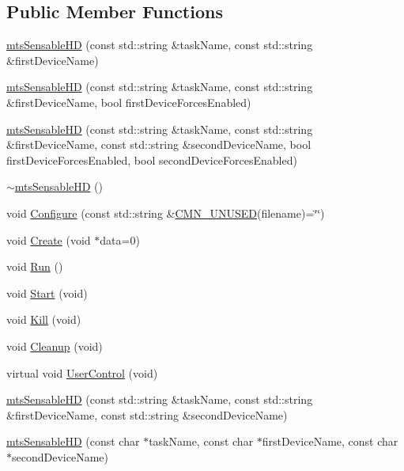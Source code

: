 \subsection*{Public Member Functions}
\begin{DoxyCompactItemize}
\item 
\hyperlink{classmts_sensable_h_d_a8edc1b99888eea9146e97e9e1e4244a2}{mts\-Sensable\-H\-D} (const std\-::string \&task\-Name, const std\-::string \&first\-Device\-Name)
\item 
\hyperlink{classmts_sensable_h_d_a65eb4de4d62c141f61b4c5afaa3b12ca}{mts\-Sensable\-H\-D} (const std\-::string \&task\-Name, const std\-::string \&first\-Device\-Name, bool first\-Device\-Forces\-Enabled)
\item 
\hyperlink{classmts_sensable_h_d_a21ff41ea6bf303e046d42f1c5843d31a}{mts\-Sensable\-H\-D} (const std\-::string \&task\-Name, const std\-::string \&first\-Device\-Name, const std\-::string \&second\-Device\-Name, bool first\-Device\-Forces\-Enabled, bool second\-Device\-Forces\-Enabled)
\item 
\hyperlink{classmts_sensable_h_d_a9fbacf9fb330e6acb3715bcb1f6ff66e}{$\sim$mts\-Sensable\-H\-D} ()
\item 
void \hyperlink{classmts_sensable_h_d_a3819baf43b57192a1a339a942d2fa0d7}{Configure} (const std\-::string \&\hyperlink{cmn_portability_8h_a021894e2626935fa2305434b1e893ff6}{C\-M\-N\-\_\-\-U\-N\-U\-S\-E\-D}(filename)=\char`\"{}\char`\"{})
\item 
void \hyperlink{classmts_sensable_h_d_a842668ae5afc97ce4513ef6c619e0a3c}{Create} (void $\ast$data=0)
\item 
void \hyperlink{classmts_sensable_h_d_a9fbf2831f6dfbb39089c53a411bff751}{Run} ()
\item 
void \hyperlink{classmts_sensable_h_d_a7541d19a105b37a06e943e503a6eea2f}{Start} (void)
\item 
void \hyperlink{classmts_sensable_h_d_a735f1a0600ddd91e112e92e520d07d46}{Kill} (void)
\item 
void \hyperlink{classmts_sensable_h_d_ae55b2349e493058a723ca94d54f341d0}{Cleanup} (void)
\item 
virtual void \hyperlink{classmts_sensable_h_d_a42fe43b1265e162e83ed815e726955da}{User\-Control} (void)
\end{DoxyCompactItemize}
{\bf }\par
\begin{DoxyCompactItemize}
\item 
\hyperlink{classmts_sensable_h_d_aed43dbeb27fa30622e969a8cf471a697}{mts\-Sensable\-H\-D} (const std\-::string \&task\-Name, const std\-::string \&first\-Device\-Name, const std\-::string \&second\-Device\-Name)
\item 
\hyperlink{classmts_sensable_h_d_ac9efabdeee298603256c66885e4fe998}{mts\-Sensable\-H\-D} (const char $\ast$task\-Name, const char $\ast$first\-Device\-Name, const char $\ast$second\-Device\-Name)
\end{DoxyCompactItemize}

